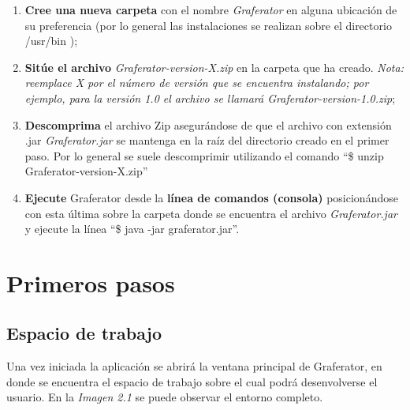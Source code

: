 \documentclass{book}
\begin{document}
\begin{enumerate}
	\itemsep=8pt \topsep=0pt \partopsep=0pt \parskip=0pt \parsep=0pt
	
	\item \textbf{Cree una nueva carpeta} con el nombre \textit{Graferator} en alguna ubicación de su preferencia (por lo general las instalaciones se realizan sobre el directorio /usr/bin );

	\item \textbf{Sitúe el archivo} \textit{Graferator-version-X.zip} en la carpeta que ha creado. \textit{Nota: reemplace X por el número de versión que se encuentra instalando; por ejemplo, para la versión 1.0 el archivo se llamará Graferator-version-1.0.zip};

	\item \textbf{Descomprima} el archivo Zip asegurándose de que el archivo con extensión .jar \textit{Graferator.jar} se mantenga en la raíz del directorio creado en el primer paso. Por lo general se suele descomprimir utilizando el comando ``{\ttfamily\footnotesize \$ unzip Graferator-version-X.zip}''

	\item \textbf{Ejecute} Graferator desde la \textbf{línea de comandos (consola)} posicionándose con esta última sobre la carpeta donde se encuentra el archivo \textit{Graferator.jar} y ejecute la línea ``{\ttfamily\footnotesize \$ java -jar graferator.jar}''.

\end{enumerate}
\bigskip




%
%
\chapter{Primeros pasos}


\section{Espacio de trabajo}

Una vez iniciada la aplicación se abrirá la ventana principal de Graferator, en donde se encuentra el espacio de trabajo sobre el cual podrá desenvolverse el usuario. En la \textit{Imagen 2.1} se puede observar el entorno completo.
\bigskip
\end{document}
